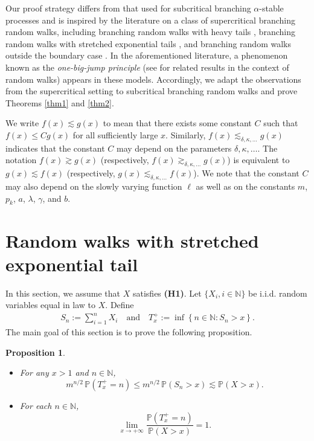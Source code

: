 \documentclass[11pt]{article}
\newtheorem{prop}[thrm]{Proposition}
\numberwithin{equation}{section}
\begin{document}
Our proof strategy differs from that used for subcritical branching $\alpha$-stable processes \cite{HJRS25, profeta22alea} and is inspired by the literature on a class of supercritical branching random walks, including branching random walks with heavy tails \cite{BHR2017, BHR2018, Durrett1983, RSZ2024}, branching random walks with stretched exponential tails \cite{DGH2023, Gantert2000}, and branching random walks outside the boundary case \cite{BHM2018, CH2026+}. In the aforementioned literature, a phenomenon known as the \emph{one-big-jump principle} (see \cite{BBY2024, DDS2008} for related results in the context of random walks) appears in these models. Accordingly, we adapt the observations from the supercritical setting to subcritical branching random walks and prove Theorems \ref{thm1} and \ref{thm2}.

We write $f(x) \lesssim g(x)$ to mean that there exists some constant $C$ such that $f(x) \leq C g(x)$ for all sufficiently large $x$. Similarly, $f(x) \lesssim_{\delta, \kappa, \dots} g(x)$ indicates that the constant $C$ may depend on the parameters $\delta, \kappa, \dots$. The notation $f(x) \gtrsim g(x)$ (respectively, $f(x) \gtrsim_{\delta, \kappa, \dots} g(x)$) is equivalent to $g(x) \lesssim f(x)$ (respectively, $g(x) \lesssim_{\delta, \kappa, \dots} f(x)$). We note that the constant $C$ may also depend on the slowly varying function $\ell$ as well as on the constants $m$, $p_k$, $a$, $\lambda$, $\gamma$, and $b$.

    \section{Random walks with stretched exponential  tail}\label{S2}
 	
 	 In this section, we assume that $X$ satisfies {\bf(H1)}. Let $\{X_i, i \in \mathbb{N}\}$ be i.i.d. random variables equal in law to $X$. Define
 	 \begin{align}\label{Def-of-stopping-time}
 	 	S_n := \sum_{i=1}^n X_i \quad \text{and} \quad T_x^+ := \inf\left\{n \in \mathbb{N} : S_n > x\right\}.
 	 \end{align}
 	 The main goal of this section is to prove the following proposition.
 
	\begin{prop}\label{prop1}
		\begin{itemize}
			\item[(i)] For any $x > 1$ and $n \in \mathbb{N}$,
			\[
			m^{n/2} \, \mathbb{P}\left(T_x^+ = n \right) \leq m^{n/2} \, \mathbb{P}\left(S_n > x \right) \lesssim \mathbb{P}(X > x).
			\]
			\item[(ii)] For each $n \in \mathbb{N}$,
			\[
			\lim_{x \to +\infty} \frac{\mathbb{P}(T_x^+ = n)}{\mathbb{P}(X > x)} = 1.
			\]
		\end{itemize}
	\end{prop}
	
\end{document}

